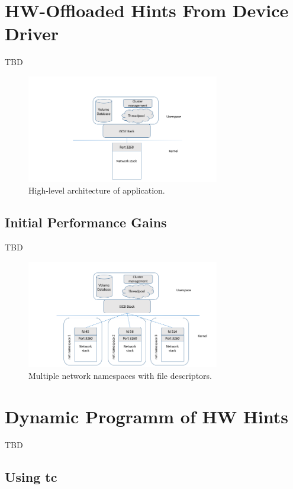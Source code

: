 \documentclass[letterpaper]{article}
\begin{document}
\section{HW-Offloaded Hints From Device Driver} 

TBD

\begin{figure}[h]
\includegraphics[width=3.31in]{standard-app-overview.png}
\caption{High-level architecture of application.}
\label{app-overview}
\end{figure}

\subsection{Initial Performance Gains}

TBD

\begin{figure}[h]
\includegraphics[width=3.31in]{multiple-namespaces-with-fd.png}
\caption{Multiple network namespaces with file descriptors.}
\label{namespace-fds}
\end{figure}

\section{Dynamic Programm of HW Hints}

TBD

\subsection{Using tc}
\end{document}
